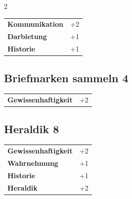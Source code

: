 \begin{multicols}{2}
\begin{tcolorbox}
\begin{tabular}{@{}ll@{}}
    \textbf{Kommunikation} & +2\\
    \textbf{Darbietung} & +1\\
    \textbf{Historie} & +1\\
\end{tabular}


\end{tcolorbox}

\begin{tcolorbox}
    \subsection*{Briefmarken sammeln \hfill \small{4 }}
    \tcblower




\begin{tabular}{@{}ll@{}}
    \textbf{Gewissenhaftigkeit} & +2\\
\end{tabular}


\end{tcolorbox}

\begin{tcolorbox}
    \subsection*{Heraldik \hfill \small{8 }}
    \tcblower




\begin{tabular}{@{}ll@{}}
    \textbf{Gewissenhaftigkeit} & +2\\
    \textbf{Wahrnehmung} & +1\\
    \textbf{Historie} & +1\\
    \textbf{Heraldik} & +2\\
\end{tabular}



\end{tcolorbox}
\end{multicols}
